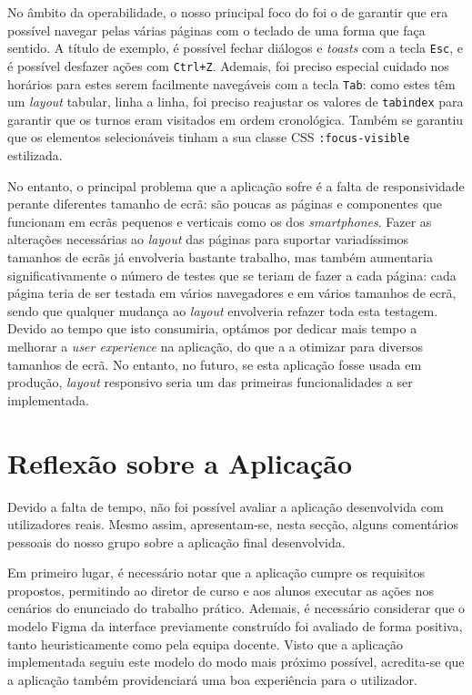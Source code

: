\documentclass[12pt, a4paper]{article}
\begin{document}
No âmbito da operabilidade, o nosso principal foco do foi o de garantir que era possível navegar
pelas várias páginas com o teclado de uma forma que faça sentido. A título de exemplo, é possível
fechar diálogos e \emph{toasts} com a tecla \texttt{Esc}, e é possível desfazer ações com
\texttt{Ctrl+Z}. Ademais, foi preciso especial cuidado nos horários para estes serem facilmente
navegáveis com a tecla \texttt{Tab}: como estes têm um \emph{layout} tabular, linha a linha, foi
preciso reajustar os valores de \texttt{tabindex} para garantir que os turnos eram visitados em
ordem cronológica. Também se garantiu que os elementos selecionáveis tinham a sua classe CSS
\texttt{:focus-visible} estilizada.

No entanto, o principal problema que a aplicação sofre é a falta de responsividade perante
diferentes tamanho de ecrã: são poucas as páginas e componentes que funcionam em ecrãs pequenos e
verticais como os dos \emph{smartphones}. Fazer as alterações necessárias ao \emph{layout} das
páginas para suportar variadíssimos tamanhos de ecrãs já envolveria bastante trabalho, mas também
aumentaria significativamente o número de testes que se teriam de fazer a cada página: cada página
teria de ser testada em vários navegadores e em vários tamanhos de ecrã, sendo que qualquer mudança
ao \emph{layout} envolveria refazer toda esta testagem. Devido ao tempo que isto consumiria, optámos
por dedicar mais tempo a melhorar a \emph{user experience} na aplicação, do que a a otimizar para
diversos tamanhos de ecrã. No entanto, no futuro, se esta aplicação fosse usada em produção,
\emph{layout} responsivo seria um das primeiras funcionalidades a ser implementada.

\section{Reflexão sobre a Aplicação}

Devido a falta de tempo, não foi possível avaliar a aplicação desenvolvida com utilizadores reais.
Mesmo assim, apresentam-se, nesta secção, alguns comentários pessoais do nosso grupo sobre a
aplicação final desenvolvida.

Em primeiro lugar, é necessário notar que a aplicação cumpre os requisitos propostos, permitindo ao
diretor de curso e aos alunos executar as ações nos cenários do enunciado do trabalho prático.
Ademais, é necessário considerar que o modelo Figma da interface previamente construído foi avaliado
de forma positiva, tanto heuristicamente como pela equipa docente. Visto que a aplicação
implementada seguiu este modelo do modo mais próximo possível, acredita-se que a aplicação também
providenciará uma boa experiência para o utilizador.
\end{document}
